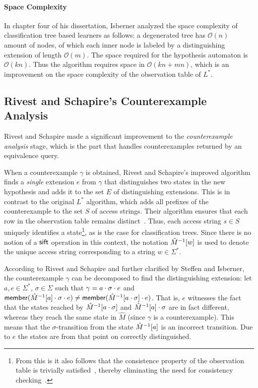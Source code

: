 \paragraph{Space Complexity} In chapter four of his dissertation, Isberner
analyzed the space complexity of classification tree based learners as follows:
a degenerated tree has $\mathcal{O}(n)$ amount of nodes, of which each inner
node is labeled by a distinguishing extension of length
$\mathcal{O}(m)$\cite{Isberner2015a}. The space required for the hypothesis
automaton is $\mathcal{O}(kn)$\cite{Isberner2015a}. Thus the algorithm requires
space in $\mathcal{O}(kn + mn)$\cite{Isberner2014b,Isberner2015a}, which is an
improvement on the space complexity of the observation table of $L^*$.

\subsection{Rivest and Schapire's Counterexample Analysis}
\label{sec:rivest-schap-count}
Rivest and Schapire made a significant improvement\cite{Rivest1993} to the
\textit{counterexample analysis} stage, which is the part that handles
counterexamples returned by an equivalence query.

When a counterexample $\gamma$ is obtained, Rivest and Schapire's improved
algorithm finds a \textit{single} extension $e$ from $\gamma$ that distinguishes
two states in the new hypothesis and adds it to the set $E$ of distinguishing
extensions. This is in contrast to the original $L^*$ algorithm, which adds all
prefixes of the counterexample to the set $S$ of access strings. Their algorithm
ensures that each row in the observation table remains
distinct~\cite{Rivest1993}. Thus, each access string $s \in S$ uniquely
identifies a state\footnote{From this is it also follows that the consistence
  property of the observation table is trivially satisfied~\cite{Rivest1993},
  thereby eliminating the need for consistency checking~\cite{Howar2014}.}, as
is the case for classification trees. Since there is no notion of a $\mathsf{sift}$
operation in this context, the notation $\hat M^{-1}[w]$ is used to denote
the unique access string corresponding to a string $w \in \Sigma^*$.

According to Rivest and Schapire\cite{Rivest1993} and further clarified by
Steffen\cite{Steffen2011} and Isberner\cite{Isberner2014a}, the counterexample
$\gamma$ can be decomposed to find the distinguishing extension: let
$a, e \in \Sigma^*$, $\sigma \in \Sigma$ such that
$\gamma = a \cdot \sigma \cdot e$ and
$\mathsf{member}(\hat M^{-1}[a]\cdot\sigma\cdot e) \neq \mathsf{member}(\hat
  M^{-1}[a\cdot\sigma]\cdot e)$. That is, $e$ witnesses the fact that the states
reached by $\hat M^{-1}[a\cdot\sigma]$ and
$\hat M^{-1}[a]\cdot\sigma$ are in fact different, whereas they reach the
same state in $\hat M$ (since $\gamma$ is a counterexample). This means that the
$\sigma$-transition from the state $\hat M^{-1}[a]$ is an incorrect
transition. Due to $e$ the states are from that point on correctly
distinguished.

